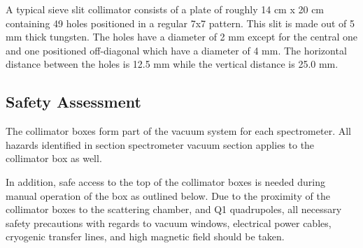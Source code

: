 A typical sieve slit collimator 
consists of a plate of roughly 14 cm x 20 cm containing 49 holes
positioned in a regular 7x7 pattern. This slit is made out of 5
mm thick tungsten.
The holes have a diameter of 2 mm except for the central one and one positioned
off-diagonal which have a diameter of 4 mm. The horizontal distance between the
holes is 12.5 mm while the vertical distance is 25.0 mm.
%

\begin{safetyen}{10}{5}
\subsection{Safety Assessment}

The collimator boxes form part of the vacuum system for each spectrometer. All hazards
identified in section spectrometer vacuum section applies to the collimator box as well.

In addition, safe access to the top of
the collimator boxes is needed  during manual operation of the box as outlined below.
Due to the proximity of the collimator boxes to the scattering chamber, and Q1 quadrupoles,
all necessary safety precautions with regards to vacuum windows, electrical power cables, 
cryogenic transfer lines, and high magnetic field should be taken.
\end{safetyen}

